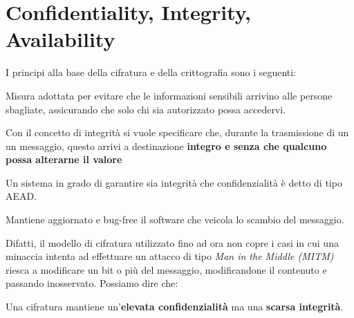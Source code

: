 \section{Confidentiality, Integrity, Availability}
I principi alla base della cifratura e della crittografia sono i seguenti:
\begin{definition}[Confidentiality]\label{def:confidentiality}
Misura adottata per evitare che le informazioni sensibili arrivino alle persone sbagliate, assicurando che solo chi sia autorizzato possa accedervi.
\end{definition}
\begin{definition}[Integrity]\label{def:integrity}
Con il concetto di integrità si vuole specificare che, durante la trasmissione di un un messaggio, questo arrivi a destinazione \textbf{integro e senza che qualcuno possa alterarne il valore}
\end{definition}
\begin{definition}\label{def:aead}
Un sistema in grado di garantire sia integrità che confidenzialità è detto di tipo AEAD.
\end{definition}
\begin{definition}[Availability]
Mantiene aggiornato e bug-free il software che veicola lo scambio del messaggio.
\end{definition}
Difatti, il modello di cifratura utilizzato fino ad ora non copre i casi in cui una minaccia intenta ad effettuare un attacco di tipo \emph{Man in the Middle (MITM)} riesca a modificare un bit o più del messaggio, modificandone il contenuto e passando inosservato. Possiamo dire che:
\begin{proposition}
Una cifratura mantiene un'\textbf{elevata confidenzialità} ma una \textbf{scarsa integrità}.
\end{proposition}
